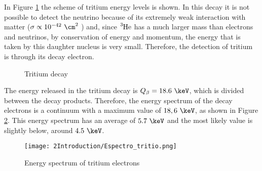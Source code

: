 In Figure \ref{fig:TritiumDecay} the scheme of tritium energy levels is shown. In this decay it is not possible to detect the neutrino because of its extremely weak interaction with matter ($\sigma \propto 10^{-42} ~ \cm^2$ \cite{CrossSeccionNeutrino}) and, since $\ce{^{3}He}$ has a much larger mass than electrons and neutrinos, by conservation of energy and momentum, the energy that is taken by this daughter nucleus is very small. Therefore, the detection of tritium is through its decay electron. 

\begin{figure}[hbtp]
 \centering
 \caption{Tritium decay}
 \label{fig:TritiumDecay}
\end{figure}

The energy released in the tritium decay is $Q_\beta=18.6~\keV$, which is divided between the decay products. Therefore, the energy spectrum of the decay electrons is a continuum with a maximum value of $18,6~\keV$, as shown in Figure \ref{fig:TritiumDecaySpectrum}. This energy spectrum has an average of $5.7~\keV$ and the most likely value is slightly below, around $4.5~\keV$.

\begin{figure}[hbtp]
\texttt{[image: 2Introduction/Espectro\_tritio.png]}
\centering
\caption{Energy spectrum of tritium electrons ~\cite{TritiumEspectrum}\label{fig:TritiumDecaySpectrum}}
\end{figure}



